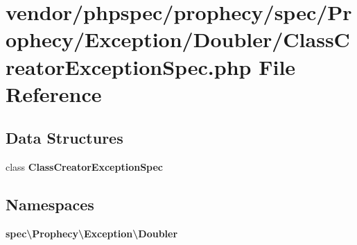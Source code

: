 \section{vendor/phpspec/prophecy/spec/\+Prophecy/\+Exception/\+Doubler/\+Class\+Creator\+Exception\+Spec.php File Reference}
\label{_class_creator_exception_spec_8php}
\subsection*{Data Structures}
\begin{DoxyCompactItemize}
\item 
class {\bf Class\+Creator\+Exception\+Spec}
\end{DoxyCompactItemize}
\subsection*{Namespaces}
\begin{DoxyCompactItemize}
\item 
 {\bf spec\textbackslash{}\+Prophecy\textbackslash{}\+Exception\textbackslash{}\+Doubler}
\end{DoxyCompactItemize}
